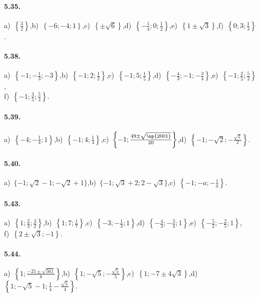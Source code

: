 \paragraph{5.35.} a)~$\left\{\frac 3 2\right\}$,\quad b)~$\left\{-6;-4;1\right\}$,\quad c)~$\left\{\pm\sqrt 6\right\}$,\quad d)~$\left\{-\frac 1 4;0;\frac 1 2\right\}$,\quad e)~$\left\{1\pm \sqrt 3\right\}$,\quad f)~$\left\{0;3;\frac 1 3\right\}$.

\paragraph{5.38.} a)~$\left\{-1;-\frac 1 3;-3\right\}$,\quad b)~$\left\{-1;2;\frac 1 2 \right\}$,\quad c)~$\left\{-1;5;\frac 1 5\right\}$,\quad d)~$\left\{-\frac 4 3;-1;-\frac 3 4\right\}$,\quad e)~$\left\{-1;\frac 2 5;\frac 5 2\right\}$,\protect \\
f)~$\left\{-1;\frac 3 5;\frac 5 3\right\}$.

\paragraph{5.39.} a)~$\left\{-4;-\frac 1 4;1\right\}$,\quad b)~$\left\{-1;4;\frac 1 4\right\}$,\quad c)~$\left\{-1;\frac{49\pm \sqrt{\np{2001}}}{20}\right\}$,\quad d)~$\left\{-1;-\sqrt 2;-\frac{\sqrt 2} 2\right\}$.

\paragraph{5.40.} a)~$\{-1;\sqrt 2-1;-\sqrt 2+1\}$,\quad b)~$\{-1;\sqrt 3+2;2-\sqrt 3\}$,\quad c)~$\left\{-1;-a;-\frac 1 a\right\}$.

\paragraph{5.43.} a)~$\left\{1;\frac 2 3;\frac 3 2\right\}$,\quad b)~$\left\{1;7;\frac 1 7\right\}$,\quad c)~$\left\{-3;-\frac 1 3;1\right\}$,\quad d)~$\left\{-\frac 4 3;-\frac 3 4;1\right\}$,\quad e)~$\left\{-\frac 5 2;-\frac 2 5;1\right\}$,\protect\\ f)~$\left\{2\pm\sqrt 3;-1\right\}$.

\paragraph{5.44.} a)~$\left\{1;\frac{-25\pm \sqrt{561}} 8\right\}$,\quad b)~$\left\{1;-\sqrt 5;-\frac{\sqrt 5} 5\right\}$,\quad c)~$\left\{1;-7\pm 4\sqrt 3\right\}$,\quad d)~$\left\{1;-\sqrt 5-1;\frac 1 4-\frac{\sqrt 5} 4\right\}$.

